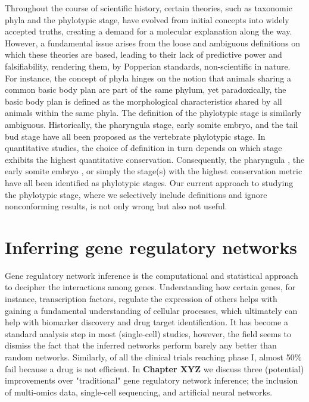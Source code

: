 Throughout the course of scientific history, certain theories, such as taxonomic phyla and the phylotypic stage, have evolved from initial concepts into widely accepted truths, creating a demand for a molecular explanation along the way. However, a fundamental issue arises from the loose and ambiguous definitions on which these theories are based, leading to their lack of predictive power and falsifiability, rendering them, by Popperian standards, non-scientific in nature. For instance, the concept of phyla hinges on the notion that animals sharing a common basic body plan are part of the same phylum, yet paradoxically, the basic body plan is defined as the morphological characteristics shared by all animals within the same phyla\cite{BUDD2000,scholtz2004bauplane}. The definition of the phylotypic stage is similarly ambiguous. Historically, the pharyngula stage\cite{BALLARD1981}, early somite embryo\cite{Alberch1993}, and the tail bud stage \cite{Slack1993} have all been proposed as the vertebrate phylotypic stage. In quantitative studies, the choice of definition in turn depends on which stage exhibits the highest quantitative conservation. Consequently, the pharyngula \cite{Irie2011,marletaz2018}, the early somite embryo \cite{DomazetLoso2010}, or simply the stage(s) with the highest conservation metric\cite{Kalinka2010,Cordero2020} have all been identified as phylotypic stages. Our current approach to studying the phylotypic stage, where we selectively include definitions and ignore nonconforming results, is not only wrong but also not useful.

\section{Inferring gene regulatory networks}

Gene regulatory network inference is the computational and statistical approach to decipher the interactions among genes. Understanding how certain genes, for instance, transcription factors, regulate the expression of others helps with gaining a fundamental understanding of cellular processes, which ultimately can help with biomarker discovery and drug target identification. It has become a standard analysis step in most (single-cell) studies, however, the field seems to dismiss the fact that the inferred networks perform barely any better than random networks\cite{McCalla_2021,Chen_2018,Pratapa_2020}. Similarly, of all the clinical trials reaching phase I, almost 50\% fail because a drug is not efficient\cite{Sun2022}. In \textbf{Chapter XYZ} we discuss three (potential) improvements over "traditional" gene regulatory network inference; the inclusion of multi-omics data, single-cell sequencing, and artificial neural networks.

